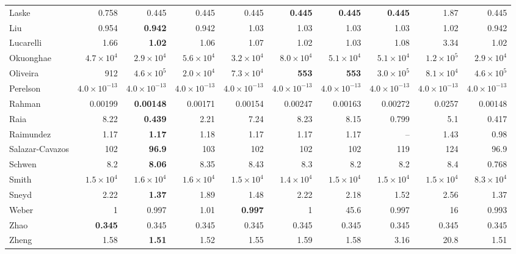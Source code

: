 \begin{longtable}{@{}lrrrrrrrrr@{}}
Laske & 0.758 & 0.445 & 0.445 & 0.445 & \textbf{0.445} & \textbf{0.445} & \textbf{0.445} & 1.87 & 0.445 \\
Liu & 0.954 & \textbf{0.942} & 0.942 & 1.03 & 1.03 & 1.03 & 1.03 & 1.02 & 0.942 \\
Lucarelli & 1.66 & \textbf{1.02} & 1.06 & 1.07 & 1.02 & 1.03 & 1.08 & 3.34 & 1.02 \\
Okuonghae & $4.7\times10^{4}$ & \textbf{$2.9\times10^{4}$} & $5.6\times10^{4}$ & $3.2\times10^{4}$ & $8.0\times10^{4}$ & $5.1\times10^{4}$ & $5.1\times10^{4}$ & $1.2\times10^{5}$ & $2.9\times10^{4}$ \\
Oliveira & 912 & $4.6\times10^{5}$ & $2.0\times10^{4}$ & $7.3\times10^{4}$ & \textbf{553} & \textbf{553} & $3.0\times10^{5}$ & $8.1\times10^{4}$ & $4.6\times10^{5}$ \\
Perelson & \textbf{$4.0\times10^{-13}$} & \textbf{$4.0\times10^{-13}$} & \textbf{$4.0\times10^{-13}$} & \textbf{$4.0\times10^{-13}$} & \textbf{$4.0\times10^{-13}$} & \textbf{$4.0\times10^{-13}$} & \textbf{$4.0\times10^{-13}$} & $4.0\times10^{-13}$ & $4.0\times10^{-13}$ \\
Rahman & 0.00199 & \textbf{0.00148} & 0.00171 & 0.00154 & 0.00247 & 0.00163 & 0.00272 & 0.0257 & 0.00148 \\
Raia & 8.22 & \textbf{0.439} & 2.21 & 7.24 & 8.23 & 8.15 & 0.799 & 5.1 & 0.417 \\
Raimundez & 1.17 & \textbf{1.17} & 1.18 & 1.17 & 1.17 & 1.17 & -- & 1.43 & 0.98 \\
Salazar-Cavazos & 102 & \textbf{96.9} & 103 & 102 & 102 & 102 & 119 & 124 & 96.9 \\
Schwen & 8.2 & \textbf{8.06} & 8.35 & 8.43 & 8.3 & 8.2 & 8.2 & 8.4 & 0.768 \\
Smith & $1.5\times10^{4}$ & $1.6\times10^{4}$ & $1.6\times10^{4}$ & $1.5\times10^{4}$ & \textbf{$1.4\times10^{4}$} & $1.5\times10^{4}$ & $1.5\times10^{4}$ & $1.5\times10^{4}$ & $8.3\times10^{4}$ \\
Sneyd & 2.22 & \textbf{1.37} & 1.89 & 1.48 & 2.22 & 2.18 & 1.52 & 2.56 & 1.37 \\
Weber & 1 & 0.997 & 1.01 & \textbf{0.997} & 1 & 45.6 & 0.997 & 16 & 0.993 \\
Zhao & \textbf{0.345} & 0.345 & 0.345 & 0.345 & 0.345 & 0.345 & 0.345 & 0.345 & 0.345 \\
Zheng & 1.58 & \textbf{1.51} & 1.52 & 1.55 & 1.59 & 1.58 & 3.16 & 20.8 & 1.51 \\
\bottomrule
\end{longtable}
